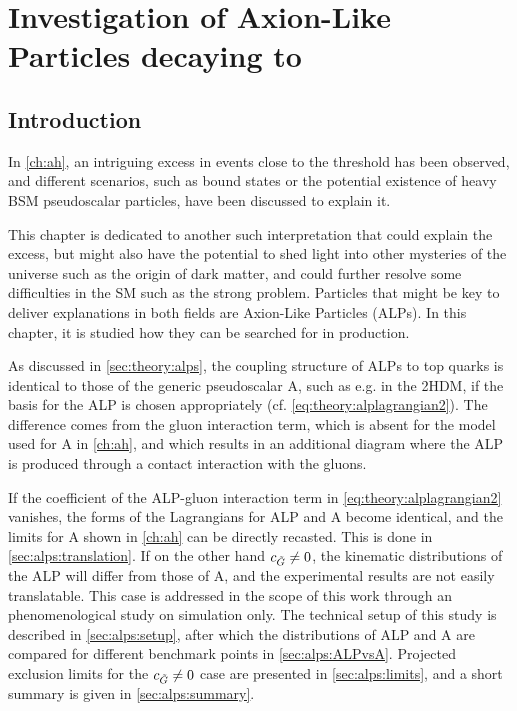 \chapter{Investigation of Axion-Like Particles decaying to \ttbartitle}
\label{ch:alps}

\section{Introduction}

In \cref{ch:ah}, an intriguing excess in \ttbar events close to the \ttbar threshold has been observed, and different scenarios, such as \ttbar bound states or the potential existence of heavy BSM pseudoscalar particles, have been discussed to explain it.

This chapter is dedicated to another such interpretation that could explain the excess, but might also have the potential to shed light into other mysteries of the universe such as the origin of dark matter, and could further resolve some difficulties in the SM such as the strong \CP problem. Particles that might be key to deliver explanations in both fields are Axion-Like Particles (ALPs). In this chapter, it is studied how they can be searched for in \ttbar production.

As discussed in \cref{sec:theory:alps}, the coupling structure of ALPs to top quarks is identical to those of the generic pseudoscalar A, such as e.g. in the 2HDM, if the basis for the ALP is chosen appropriately (cf. \cref{eq:theory:alplagrangian2}). The difference comes from the gluon interaction term, which is absent for the model used for A in \cref{ch:ah}, and which results in an additional diagram where the ALP is produced through a contact interaction with the gluons. 

If the coefficient \cG of the ALP-gluon interaction term in \cref{eq:theory:alplagrangian2} vanishes, the forms of the Lagrangians for ALP and A become identical, and the limits for A shown in \cref{ch:ah} can be directly recasted. This is done in \cref{sec:alps:translation}. If on the other hand $c_{\tilde{G}} \neq 0$, the kinematic distributions of the ALP will differ from those of A, and the experimental results are not easily translatable. This case is addressed in the scope of this work through an phenomenological study on simulation only. The technical setup of this study is described in \cref{sec:alps:setup}, after which the distributions of ALP and A are compared for different benchmark points in \cref{sec:alps:ALPvsA}. Projected exclusion limits for the $c_{\tilde{G}} \neq 0$ case are presented in \cref{sec:alps:limits}, and a short summary is given in \cref{sec:alps:summary}.

